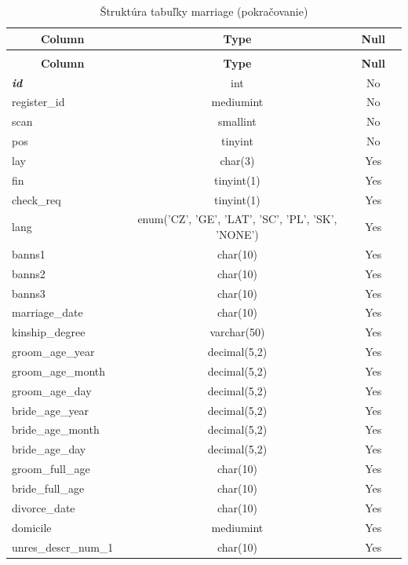 \begin{longtable}{|l|c|c|c|}
 \caption{Štruktúra tabuľky marriage} \label{tab:marriage-structure} \\
 \hline \multicolumn{1}{|c|}{\textbf{Column}} & \multicolumn{1}{|c|}{\textbf{Type}} & \multicolumn{1}{|c|}{\textbf{Null}} \\ \hline \hline
\endfirsthead
 \caption{Štruktúra tabuľky marriage (pokračovanie)} \\
 \hline \multicolumn{1}{|c|}{\textbf{Column}} & \multicolumn{1}{|c|}{\textbf{Type}} & \multicolumn{1}{|c|}{\textbf{Null}} \\ \hline \hline \endhead \endfoot
\textbf{\textit{id}} & int & No \\ \hline
register\_id & mediumint & No \\ \hline
scan & smallint & No \\ \hline
pos & tinyint & No \\ \hline
lay & char(3) & Yes \\ \hline
fin & tinyint(1) & Yes \\ \hline
check\_req & tinyint(1) & Yes \\ \hline
lang & enum('CZ', 'GE', 'LAT', 'SC', 'PL', 'SK', 'NONE') & Yes \\ \hline
banns1 & char(10) & Yes \\ \hline
banns2 & char(10) & Yes \\ \hline
banns3 & char(10) & Yes \\ \hline
marriage\_date & char(10) & Yes \\ \hline
kinship\_degree & varchar(50) & Yes \\ \hline
groom\_age\_year & decimal(5,2) & Yes \\ \hline
groom\_age\_month & decimal(5,2) & Yes \\ \hline
groom\_age\_day & decimal(5,2) & Yes \\ \hline
bride\_age\_year & decimal(5,2) & Yes \\ \hline
bride\_age\_month & decimal(5,2) & Yes \\ \hline
bride\_age\_day & decimal(5,2) & Yes \\ \hline
groom\_full\_age & char(10) & Yes \\ \hline
bride\_full\_age & char(10) & Yes \\ \hline
divorce\_date & char(10) & Yes \\ \hline
domicile & mediumint & Yes \\ \hline
unres\_descr\_num\_1 & char(10) & Yes \\ \hline

\end{longtable}
